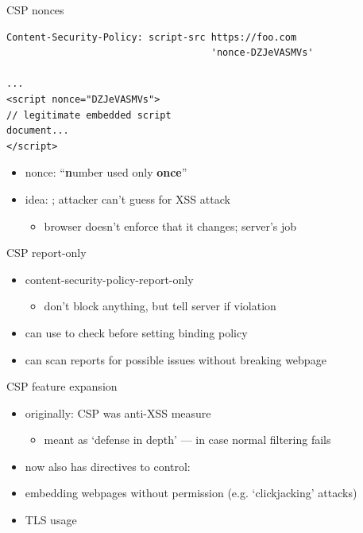 \begin{frame}[fragile,label=CSPNonces]{CSP nonces}
\begin{verbatim}
Content-Security-Policy: script-src https://foo.com
                                    'nonce-DZJeVASMVs'

...
<script nonce="DZJeVASMVs">
// legitimate embedded script
document...
</script>
\end{verbatim}
    \begin{itemize}
    \item nonce: ``\textbf{n}umber used only \textbf{once}''
    \item idea: ; attacker can't guess for XSS attack
        \begin{itemize}
        \item browser doesn't enforce that it changes; server's job
        \end{itemize}
    \end{itemize}
\end{frame}

\begin{frame}{CSP report-only}
    \begin{itemize}
    \item content-security-policy-report-only
        \begin{itemize}
        \item don't block anything, but tell server if violation
        \end{itemize}
    \item can use to check before setting binding policy
    \item can scan reports for possible issues without breaking webpage
    \end{itemize}
\end{frame}

\begin{frame}{CSP feature expansion}
    \begin{itemize}
    \item originally: CSP was anti-XSS measure
        \begin{itemize}
        \item meant as `defense in depth' --- in case normal filtering fails
        \end{itemize}
    \item now also has directives to control:
    \item embedding webpages without permission (e.g. `clickjacking' attacks)
    \item TLS usage
    \end{itemize}
\end{frame}

